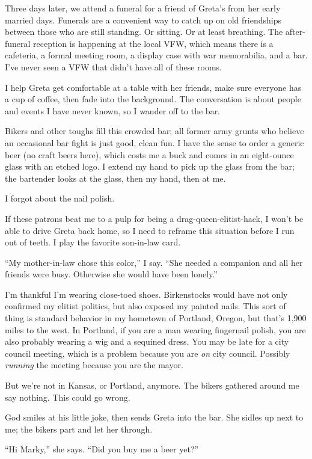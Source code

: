\documentclass[
  letterpaper,
  DIV=11,
  numbers=noendperiod]{scrreprt}
\begin{document}
Three days later, we attend a funeral for a friend of Greta's from her
early married days. Funerals are a convenient way to catch up on old
friendships between those who are still standing. Or sitting. Or at
least breathing. The after-funeral reception is happening at the local
VFW, which means there is a cafeteria, a formal meeting room, a display
case with war memorabilia, and a bar. I've never seen a VFW that didn't
have all of these rooms.

I help Greta get comfortable at a table with her friends, make sure
everyone has a cup of coffee, then fade into the background. The
conversation is about people and events I have never known, so I wander
off to the bar.

Bikers and other toughs fill this crowded bar; all former army grunts
who believe an occasional bar fight is just good, clean fun. I have the
sense to order a generic beer (no craft beers here), which costs me a
buck and comes in an eight-ounce glass with an etched logo. I extend my
hand to pick up the glass from the bar; the bartender looks at the
glass, then my hand, then at me.

I forgot about the nail polish.

If these patrons beat me to a pulp for being a drag-queen-elitist-hack,
I won't be able to drive Greta back home, so I need to reframe this
situation before I run out of teeth. I play the favorite son-in-law
card.

``My mother-in-law chose this color,'' I say. ``She needed a companion
and all her friends were busy. Otherwise she would have been lonely.''

I'm thankful I'm wearing close-toed shoes. Birkenstocks would have not
only confirmed my elitist politics, but also exposed my painted nails.
This sort of thing is standard behavior in my hometown of Portland,
Oregon, but that's 1,900 miles to the west. In Portland, if you are a
man wearing fingernail polish, you are also probably wearing a wig and a
sequined dress. You may be late for a city council meeting, which is a
problem because you are \emph{on} city council. Possibly \emph{running}
the meeting because you are the mayor.

But we're not in Kansas, or Portland, anymore. The bikers gathered
around me say nothing. This could go wrong.

God smiles at his little joke, then sends Greta into the bar. She sidles
up next to me; the bikers part and let her through.

``Hi Marky,'' she says. ``Did you buy me a beer yet?''
\end{document}
